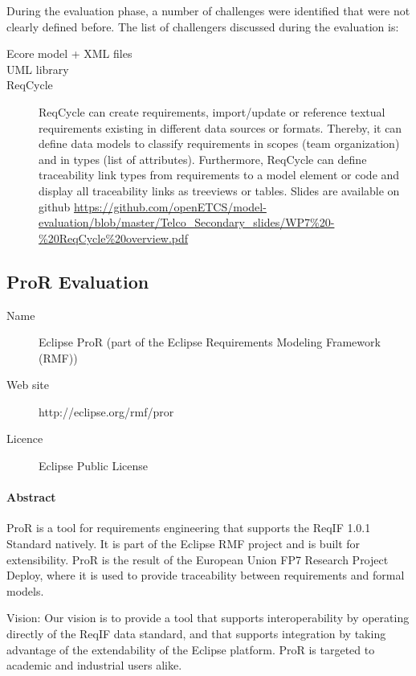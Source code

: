 During the evaluation phase, a number of challenges were identified that were not clearly defined before.
The list of challengers discussed during the evaluation is:

\begin{description}

\item [Ecore model + XML  files]
\item [UML library]
\item [ReqCycle]
ReqCycle can create requirements, import/update or reference textual requirements existing in different data sources or formats. Thereby, it can define data models to classify requirements in scopes (team organization) and in types (list of attributes). Furthermore, ReqCycle can define traceability link types from requirements to a model element or code and display all traceability links as treeviews or tables. Slides are available on github \url{https://github.com/openETCS/model-evaluation/blob/master/Telco_Secondary_slides/WP7%20-%20ReqCycle%20overview.pdf}
\end{description}

\subsection{ProR Evaluation}
\label{sec:ProR}

\begin{description}
\item[Name] Eclipse ProR (part of the Eclipse Requirements Modeling Framework (RMF))
\item[Web site] http://eclipse.org/rmf/pror
\item[Licence] Eclipse Public License
\end{description} 

\paragraph{Abstract}

ProR is a tool for requirements engineering that supports the ReqIF 1.0.1 Standard natively. It is part of the Eclipse RMF project and is built for extensibility. ProR is the result of the European Union FP7 Research Project Deploy, where it is used to provide traceability between requirements and formal models.

Vision: Our vision is to provide a tool that supports interoperability by operating directly of the ReqIF data standard, and that supports integration by taking advantage of the extendability of the Eclipse platform. ProR is targeted to academic and industrial users alike. 

